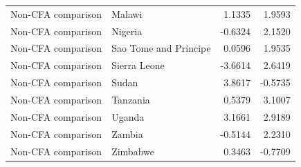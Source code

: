 \begin{table}
\begin{tabular}[t]{llrr}
Non-CFA comparison & Malawi & 1.1335 & 1.9593\\
Non-CFA comparison & Nigeria & -0.6324 & 2.1520\\
Non-CFA comparison & Sao Tome and Principe & 0.0596 & 1.9535\\
Non-CFA comparison & Sierra Leone & -3.6614 & 2.6419\\
\addlinespace
Non-CFA comparison & Sudan & 3.8617 & -0.5735\\
Non-CFA comparison & Tanzania & 0.5379 & 3.1007\\
Non-CFA comparison & Uganda & 3.1661 & 2.9189\\
Non-CFA comparison & Zambia & -0.5144 & 2.2310\\
Non-CFA comparison & Zimbabwe & 0.3463 & -0.7709\\
\bottomrule
\end{tabular}
\end{table}